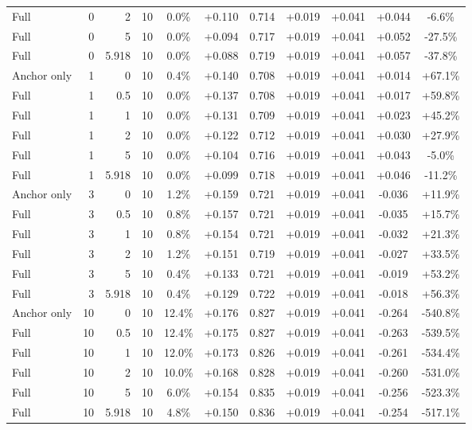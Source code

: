 \begin{table}[htbp]
\begin{tabular}{lrrrccccccc}
Full & 0 & 2 & 10 & 0.0\% & +0.110 & 0.714 & +0.019 & +0.041 & +0.044 & -6.6\% \\
Full & 0 & 5 & 10 & 0.0\% & +0.094 & 0.717 & +0.019 & +0.041 & +0.052 & -27.5\% \\
Full & 0 & 5.918 & 10 & 0.0\% & +0.088 & 0.719 & +0.019 & +0.041 & +0.057 & -37.8\% \\
Anchor only & 1 & 0 & 10 & 0.4\% & +0.140 & 0.708 & +0.019 & +0.041 & +0.014 & +67.1\% \\
Full & 1 & 0.5 & 10 & 0.0\% & +0.137 & 0.708 & +0.019 & +0.041 & +0.017 & +59.8\% \\
Full & 1 & 1 & 10 & 0.0\% & +0.131 & 0.709 & +0.019 & +0.041 & +0.023 & +45.2\% \\
Full & 1 & 2 & 10 & 0.0\% & +0.122 & 0.712 & +0.019 & +0.041 & +0.030 & +27.9\% \\
Full & 1 & 5 & 10 & 0.0\% & +0.104 & 0.716 & +0.019 & +0.041 & +0.043 & -5.0\% \\
Full & 1 & 5.918 & 10 & 0.0\% & +0.099 & 0.718 & +0.019 & +0.041 & +0.046 & -11.2\% \\
Anchor only & 3 & 0 & 10 & 1.2\% & +0.159 & 0.721 & +0.019 & +0.041 & -0.036 & +11.9\% \\
Full & 3 & 0.5 & 10 & 0.8\% & +0.157 & 0.721 & +0.019 & +0.041 & -0.035 & +15.7\% \\
Full & 3 & 1 & 10 & 0.8\% & +0.154 & 0.721 & +0.019 & +0.041 & -0.032 & +21.3\% \\
Full & 3 & 2 & 10 & 1.2\% & +0.151 & 0.719 & +0.019 & +0.041 & -0.027 & +33.5\% \\
Full & 3 & 5 & 10 & 0.4\% & +0.133 & 0.721 & +0.019 & +0.041 & -0.019 & +53.2\% \\
Full & 3 & 5.918 & 10 & 0.4\% & +0.129 & 0.722 & +0.019 & +0.041 & -0.018 & +56.3\% \\
Anchor only & 10 & 0 & 10 & 12.4\% & +0.176 & 0.827 & +0.019 & +0.041 & -0.264 & -540.8\% \\
Full & 10 & 0.5 & 10 & 12.4\% & +0.175 & 0.827 & +0.019 & +0.041 & -0.263 & -539.5\% \\
Full & 10 & 1 & 10 & 12.0\% & +0.173 & 0.826 & +0.019 & +0.041 & -0.261 & -534.4\% \\
Full & 10 & 2 & 10 & 10.0\% & +0.168 & 0.828 & +0.019 & +0.041 & -0.260 & -531.0\% \\
Full & 10 & 5 & 10 & 6.0\% & +0.154 & 0.835 & +0.019 & +0.041 & -0.256 & -523.3\% \\
Full & 10 & 5.918 & 10 & 4.8\% & +0.150 & 0.836 & +0.019 & +0.041 & -0.254 & -517.1\% \\

\end{tabular}
\end{table}
